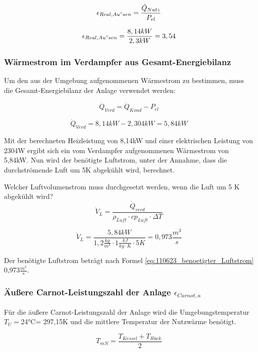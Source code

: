 \begin{equation}
\epsilon_{Real,Au"sen} = \frac{\dot Q_{Nutz}}{P_{el}}
\label{eq:110623_aeußere Leistungszahl_tatsächlich}
\end{equation}

$$ \epsilon_{Real,Au"sen} = \frac{8,14 kW}{2,3 kW} = 3,54$$

\subsubsection{Wärmestrom im Verdampfer aus Gesamt-Energiebilanz}
Um den aus der Umgebung aufgenommenen Wärmestrom zu bestimmen, muss die Gesamt-Energiebilanz der Anlage verwendet werden:

\begin{equation}
\dot Q_{Verd}=\dot Q_{Kond}-P_{el}
\label{eq:110623_aeußere Leistungszahl}
\end{equation}

$$\dot Q_{Verd}= 8,14 kW-2,304 kW= 5,84kW $$


Mit der berechneten Heizleistung von 8,14kW und einer elektrischen Leistung von 2304W ergibt sich ein vom Verdampfer aufgenommenen Wärmestrom von 5,84kW. Nun wird der benötigte Luftstrom, unter der Annahme, dass die durchströmende Luft um 5K abgekühlt wird, berechnet.

Welcher Luftvolumenstrom muss durchgesetzt werden, wenn die Luft um 5 K abgekühlt wird?
\begin{equation}
\dot V_{L}=\frac{\dot Q_{verd}}{\rho_{Luft} \cdot cp_{Luft} \cdot \Delta T}
\label{eq:110623_benoetigter_Luftstrom}
\end{equation}

$$\dot V_{L}=\frac{5,84 kW}{ 1,2 \frac{kg}{m^3} \cdot 1 \frac{kJ}{kg \cdot K} \cdot 5K}= 0,973 \frac{m^3}{s}$$


Der benötigte Luftstrom beträgt nach Formel \ref{eq:110623_benoetigter_Luftstrom} 0,973$\frac{m^3}{s}$. 
\subsubsection{Äußere Carnot-Leistungszahl der Anlage \texorpdfstring{$\epsilon_{Carnot,a}$}{}}
\label{subsubsec:Carnot}

Für die äußere Carnot-Leistungszahl der Anlage wird die Umgebungstemperatur $T_{U}=$24°C= 297,15K und die mittlere Temperatur der Nutzwärme benötigt.

\begin{equation}
    T_{mN}= \frac{T_{Kessel}+T_{Rück}}{2}
\end{equation}

